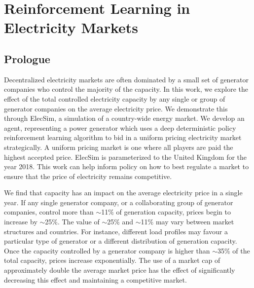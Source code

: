 \chapter{Reinforcement Learning in Electricity Markets}
\label{chapter:reinforcement}
\ifpdf
    \graphicspath{{Chapter3/Figs/Raster/}{Chapter3/Figs/PDF/}{Chapter3/Figs/}}
\else
    \graphicspath{{Chapter3/Figs/Vector/}{Chapter3/Figs/}}
\fi


\section*{Prologue}


Decentralized electricity markets are often dominated by a small set of generator companies who control the majority of the capacity. In this work, we explore the effect of the total controlled electricity capacity by any single or group of generator companies on the average electricity price. We demonstrate this through ElecSim, a simulation of a country-wide energy market. We develop an agent, representing a power generator which uses a deep deterministic policy reinforcement learning algorithm to bid in a uniform pricing electricity market strategically. A uniform pricing market is one where all players are paid the highest accepted price. ElecSim is parameterized to the United Kingdom for the year 2018. This work can help inform policy on how to best regulate a market to ensure that the price of electricity remains competitive.

We find that capacity has an impact on the average electricity price in a single year. If any single generator company, or a collaborating group of generator companies, control more than ${\sim}$11$\%$ of generation capacity, prices begin to increase by ${\sim}$25$\%$. The value of ${\sim}$25\% and ${\sim}$11\% may vary between market structures and countries. For instance, different load profiles may favour a particular type of generator or a different distribution of generation capacity. Once the capacity controlled by a generator company is higher than ${\sim}$35\% of the total capacity, prices increase exponentially. The use of a market cap of approximately double the average market price has the effect of significantly decreasing this effect and maintaining a competitive market.

